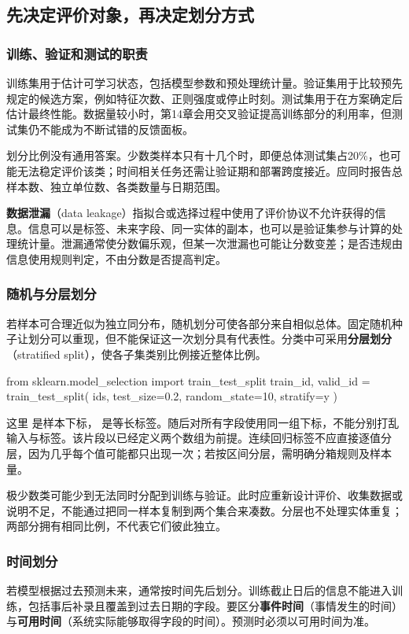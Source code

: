 \documentclass[UTF8,fontset=none,zihao=-4,a4paper]{ctexart}
\newcommand{\term}[1]{\textbf{#1}}
\newcommand{\code}[1]{\texttt{\detokenize{#1}}}
\numberwithin{equation}{section}
\numberwithin{figure}{section}
\begin{document}
\subsection{先决定评价对象，再决定划分方式}
\subsubsection{训练、验证和测试的职责}
训练集用于估计可学习状态，包括模型参数和预处理统计量。验证集用于比较预先规定的候选方案，例如特征次数、正则强度或停止时刻。测试集用于在方案确定后估计最终性能。数据量较小时，第14章会用交叉验证提高训练部分的利用率，但测试集仍不能成为不断试错的反馈面板。

划分比例没有通用答案。少数类样本只有十几个时，即便总体测试集占20\%，也可能无法稳定评价该类；时间相关任务还需让验证期和部署跨度接近。应同时报告总样本数、独立单位数、各类数量与日期范围。

\term{数据泄漏}（data leakage）指拟合或选择过程中使用了评价协议不允许获得的信息。信息可以是标签、未来字段、同一实体的副本，也可以是验证集参与计算的处理统计量。泄漏通常使分数偏乐观，但某一次泄漏也可能让分数变差；是否违规由信息使用规则判定，不由分数是否提高判定。

\subsubsection{随机与分层划分}
若样本可合理近似为独立同分布，随机划分可使各部分来自相似总体。固定随机种子让划分可以重现，但不能保证这一次划分具有代表性。分类中可采用\term{分层划分}（stratified split），使各子集类别比例接近整体比例。
\begin{pycode}
from sklearn.model_selection import train_test_split
train_id, valid_id = train_test_split(
    ids, test_size=0.2, random_state=10, stratify=y
)
\end{pycode}
这里 \code{ids} 是样本下标，\code{y} 是等长标签。随后对所有字段使用同一组下标，不能分别打乱输入与标签。该片段以已经定义两个数组为前提。连续回归标签不应直接逐值分层，因为几乎每个值可能都只出现一次；若按区间分层，需明确分箱规则及样本量。

极少数类可能少到无法同时分配到训练与验证。此时应重新设计评价、收集数据或说明不足，不能通过把同一样本复制到两个集合来凑数。分层也不处理实体重复；两部分拥有相同比例，不代表它们彼此独立。

\subsubsection{时间划分}
若模型根据过去预测未来，通常按时间先后划分。训练截止日后的信息不能进入训练，包括事后补录且覆盖到过去日期的字段。要区分\term{事件时间}（事情发生的时间）与\term{可用时间}（系统实际能够取得字段的时间）。预测时必须以可用时间为准。
\end{document}
